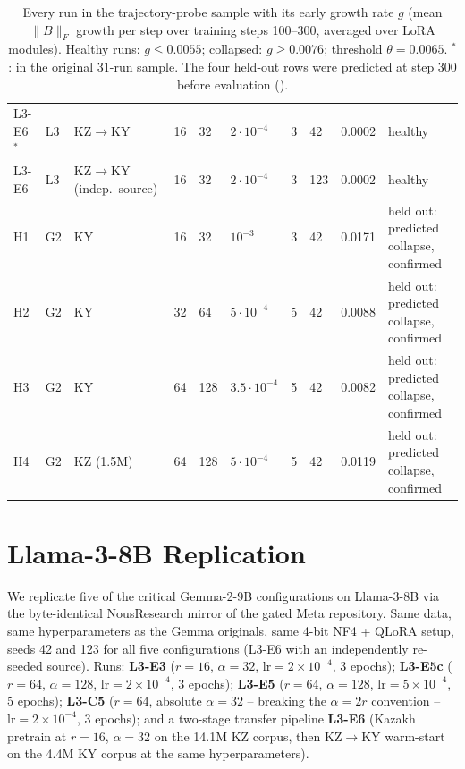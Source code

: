 \documentclass[11pt]{article}
\begin{document}
\begin{table}[!htbp]
\begin{tabular}{llllllllrl}
L3-E6$^\ast$ & L3 & KZ$\to$KY & 16 & 32 & $2{\cdot}10^{-4}$ & 3 & 42 & 0.0002 & healthy \\
L3-E6 & L3 & KZ$\to$KY (indep.\ source) & 16 & 32 & $2{\cdot}10^{-4}$ & 3 & 123 & 0.0002 & healthy \\
\midrule
H1 & G2 & KY & 16 & 32 & $10^{-3}$ & 3 & 42 & 0.0171 & held out: predicted collapse, confirmed \\
H2 & G2 & KY & 32 & 64 & $5{\cdot}10^{-4}$ & 5 & 42 & 0.0088 & held out: predicted collapse, confirmed \\
H3 & G2 & KY & 64 & 128 & $3.5{\cdot}10^{-4}$ & 5 & 42 & 0.0082 & held out: predicted collapse, confirmed \\
H4 & G2 & KZ (1.5M) & 64 & 128 & $5{\cdot}10^{-4}$ & 5 & 42 & 0.0119 & held out: predicted collapse, confirmed \\
\bottomrule
\end{tabular}
\caption{Every run in the trajectory-probe sample with its early growth rate $g$ (mean $\|B\|_F$ growth per step over training steps 100--300, averaged over LoRA modules). Healthy runs: $g \le 0.0055$; collapsed: $g \ge 0.0076$; threshold $\theta{=}0.0065$. $^\ast$: in the original 31-run sample. The four held-out rows were predicted at step 300 before evaluation ().}
\label{tab:probe_sample}
\end{table}

\section{Llama-3-8B Replication}
\label{app:llama3}

We replicate five of the critical Gemma-2-9B configurations on Llama-3-8B \citep{dubey2024llama3} via the byte-identical NousResearch mirror of the gated Meta repository. Same data, same hyperparameters as the Gemma originals, same 4-bit NF4 + QLoRA setup, seeds 42 and 123 for all five configurations (L3-E6 with an independently re-seeded source). Runs: \textbf{L3-E3} ($r{=}16$, $\alpha{=}32$, $\text{lr}{=}2{\times}10^{-4}$, 3 epochs); \textbf{L3-E5c} ($r{=}64$, $\alpha{=}128$, $\text{lr}{=}2{\times}10^{-4}$, 3 epochs); \textbf{L3-E5} ($r{=}64$, $\alpha{=}128$, $\text{lr}{=}5{\times}10^{-4}$, 5 epochs); \textbf{L3-C5} ($r{=}64$, absolute $\alpha{=}32$ -- breaking the $\alpha{=}2r$ convention -- $\text{lr}{=}2{\times}10^{-4}$, 3 epochs); and a two-stage transfer pipeline \textbf{L3-E6} (Kazakh pretrain at $r{=}16$, $\alpha{=}32$ on the 14.1M KZ corpus, then KZ$\rightarrow$KY warm-start on the 4.4M KY corpus at the same hyperparameters).
\end{document}
